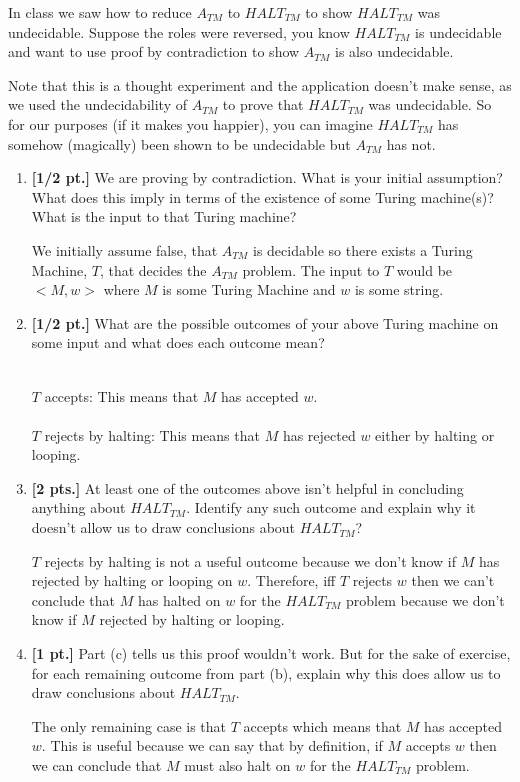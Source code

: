 \documentclass[11pt]{article}
\theoremstyle{definition}
\theoremstyle{theorem}
\newcommand{\solution}{\medskip\noindent{\color{blue}\textbf{Solution:}}}
\begin{document}
In class we saw how to reduce $A_{TM}$ to $HALT_{TM}$ to show $HALT_{TM}$ was undecidable. Suppose the roles were reversed, you know $HALT_{TM}$ is undecidable and want to use proof by contradiction to show $A_{TM}$ is also undecidable.

Note that this is a thought experiment and the application doesn't make sense, as we used the undecidability of $A_{TM}$ to prove that $HALT_{TM}$ was undecidable. So for our purposes (if it makes you happier), you can imagine $HALT_{TM}$ has somehow (magically) been shown to be undecidable but $A_{TM}$ has not.

\begin{enumerate}[label=(\alph*)]


\item \textbf{[1/2 pt.]} We are proving by contradiction. What is your initial assumption? What does this imply in terms of the existence of some Turing machine(s)? What is the input to that Turing machine?

\solution

We initially assume false, that $A_{TM}$ is decidable so there exists a Turing Machine, $T$, that decides the $A_{TM}$ problem. The input to $T$ would be $<M, w>$ where $M$ is some Turing Machine and $w$ is some string. 


\item \textbf{[1/2 pt.]} What are the possible outcomes of your above Turing machine on some input and what does each outcome mean?

\solution \\
$T$ accepts: This means that $M$ has accepted $w$. \\~\\
$T$ rejects by halting: This means that $M$ has rejected $w$ either by halting or looping.  
\item \textbf{[2 pts.]} At least one of the outcomes above isn't helpful in concluding anything about $HALT_{TM}$. Identify any such outcome and explain why it doesn't  allow us to draw conclusions about $HALT_{TM}$?

\solution

$T$ rejects by halting is not a useful outcome because we don't know if $M$ has rejected by halting or looping on $w$. Therefore, iff $T$ rejects $w$ then we can't conclude that $M$ has halted on $w$ for the $HALT_{TM}$ problem because we don't know if $M$ rejected by halting or looping.


\item \textbf{[1 pt.]} Part (c) tells us this proof wouldn't work. But for the sake of exercise, for each remaining outcome from part (b), explain why this does allow us to draw conclusions about $HALT_{TM}$.

\solution

The only remaining case is that $T$ accepts which means that $M$ has accepted $w$. This is useful because we can say that by definition, if $M$ accepts $w$ then we can conclude that $M$ must also halt on $w$ for the $HALT_{TM}$ problem. 

\end{enumerate}
\end{document}
